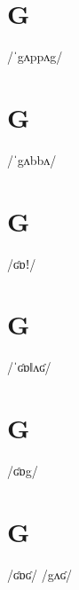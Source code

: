 \documentclass[10pt,a4paper,twoside]{book}
\begin{document}
\section*{G}

\begin{multicols}{3}
 {/ˈgʌppʌg/} {}
\end{multicols}

\section*{G}

\begin{multicols}{3}
 {/ˈgʌbbʌ/} {}
\end{multicols}

\section*{G}

\begin{multicols}{3}
 {/ʛɒǃ/} {}
\end{multicols}

\section*{G}

\begin{multicols}{3}
 {/ˈʛɒǁʌʛ/} {}
\end{multicols}

\section*{G}

\begin{multicols}{3}
 {/ʛɒg/} {}
\end{multicols}

\section*{G}

\begin{multicols}{3}
 {/ʛɒʛ/} {}
 {/gʌʛ/} {}
\end{multicols}
\end{document}
